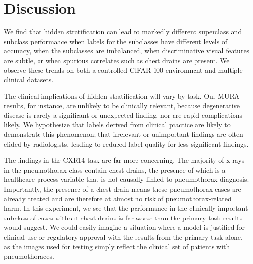 \documentclass[sigconf,anonymous,review]{acmart}
\begin{document}
%

\section{Discussion}
\label{sec:discussion}

We find that hidden stratification can lead to markedly different superclass and subclass performance when labels for the subclasses have different levels of accuracy, when the subclasses are imbalanced, when discriminative visual features are subtle, or when spurious correlates such as chest drains are present.
We observe these trends on both a controlled CIFAR-100 environment and multiple clinical datasets.

The clinical implications of hidden stratification will vary by task. 
Our MURA results, for instance, are unlikely to be clinically relevant, because degenerative disease is rarely a significant or unexpected finding, nor are rapid complications likely. 
We hypothesize that labels derived from clinical practice are likely to demonstrate this phenomenon; that irrelevant or unimportant findings are often elided by radiologists, leading to reduced label quality for less significant findings.

The findings in the CXR14 task are far more concerning. 
The majority of x-rays in the pneumothorax class contain chest drains, the presence of which is a healthcare process variable that is not causally linked to pneumothorax diagnosis.
 Importantly, the presence of a chest drain means these pneumothorax cases are already treated and are therefore at almost no risk of pneumothorax-related harm. 
 In this experiment, we see that the performance in the clinically important subclass of cases without chest drains is far worse than the primary task results would suggest. 
 We could easily imagine a situation where a model is justified for clinical use or regulatory approval with the results from the primary task alone, as the images used for testing simply reflect the clinical set of patients with pneumothoraces.
 
\end{document}
